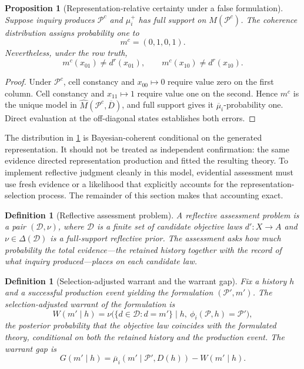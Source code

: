 \documentclass[11pt]{article}
\newtheorem{definition}[assumption]{Definition}
\newtheorem{proposition}[assumption]{Proposition}
\newcommand{\Pcol}{\mathcal P^{c}}
\begin{document}
\begin{proposition}[Representation-relative certainty under a false formulation]
\label{prop:false-coherence}
Suppose inquiry produces $\Pcol$ and $\mu_i^+$ has full support on
$M(\Pcol)$.  The coherence distribution assigns probability one to
\[
m^c=(0,1,0,1).
\]
Nevertheless, under the row truth,
\[
m^c(x_{01})\neq d^r(x_{01}),
\qquad
m^c(x_{10})\neq d^r(x_{10}).
\]
\end{proposition}

\begin{proof}
Under $\Pcol$, cell constancy and $x_{00}\mapsto0$ require value zero on the
first column.  Cell constancy and $x_{11}\mapsto1$ require value one on the
second.  Hence $m^c$ is the unique model in
$\widehat M(\Pcol,\overline D)$, and full support gives it
$\overline\mu_i$-probability one.  Direct evaluation at the off-diagonal states
establishes both errors.
\end{proof}

The distribution in \cref{prop:false-coherence} is Bayesian-coherent
conditional on the generated representation.  It should not be treated as
independent confirmation: the same evidence directed representation production
and fitted the resulting theory.  To implement reflective judgment cleanly in
this model, evidential assessment must use fresh evidence or a likelihood that
explicitly accounts for the representation-selection process.  The remainder
of this section makes that accounting exact.

\begin{definition}[Reflective assessment problem]
\label{def:reflective-assessment}
A reflective assessment problem is a pair $(\mathcal D,\nu)$, where
$\mathcal D$ is a finite set of candidate objective laws $d':X\to A$ and
$\nu\in\Delta(\mathcal D)$ is a full-support reflective prior.  The assessment
asks how much probability the total evidence---the retained history together
with the record of what inquiry produced---places on each candidate law.
\end{definition}

\begin{definition}[Selection-adjusted warrant and the warrant gap]
\label{def:warrant}
Fix a history $h$ and a successful production event yielding the formulation
$(\mathcal P',m')$.  The \emph{selection-adjusted warrant} of the formulation
is
\begin{equation}
W(m'\mid h)
=
\nu\big(\{d\in\mathcal D:d=m'\}\;\big|\;
h,\ \phi_i(\mathcal P,h)=\mathcal P'\big),
\label{eq:warrant}
\end{equation}
the posterior probability that the objective law coincides with the formulated
theory, conditional on both the retained history and the production event.
The \emph{warrant gap} is
\begin{equation}
G(m'\mid h)
=
\overline\mu_i(m'\mid\mathcal P',D(h))-W(m'\mid h).
\label{eq:warrant-gap}
\end{equation}
\end{definition}
\end{document}
